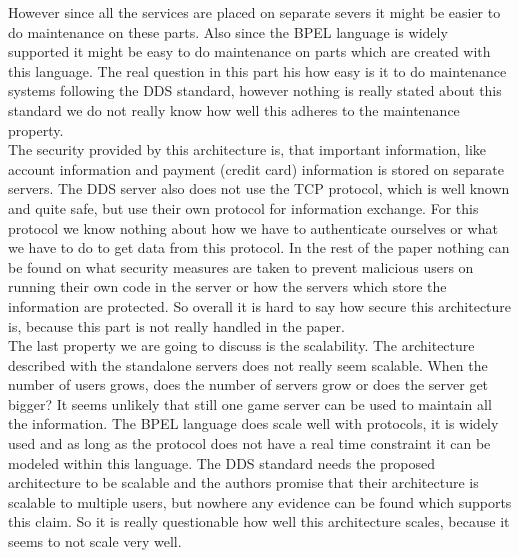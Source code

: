 \indent However since all the services are placed on separate severs it might be easier to do maintenance on these parts. 
Also since the BPEL language is widely supported it might be easy to do maintenance on parts which are created with this language. 
The real question in this part his how easy is it to do maintenance systems following the DDS standard, however nothing is really stated about this standard we do not really know how well this adheres to the maintenance property.\\
\indent The security provided by this architecture is, that important information, like account information and payment (credit card) information is stored on separate servers. 
The DDS server also does not use the TCP protocol, which is well known and quite safe, but use their own protocol for information exchange. 
For this protocol we know nothing about how we have to authenticate ourselves or what we have to do to get data from this protocol. 
In the rest of the paper nothing can be found on what security measures are taken to prevent malicious users on running their own code in the server or how the servers which store the information are protected. 
So overall it is hard to say how secure this architecture is, because this part is not really handled in the paper.\\
\indent The last property we are going to discuss is the scalability. 
The architecture described with the standalone servers does not really seem scalable. 
When the number of users grows, does the number of servers grow or does the server get bigger? 
It seems unlikely that still one game server can be used to maintain all the information. 
The BPEL language does scale well with protocols, it is widely used and as long as the protocol does not have a real time constraint it can be modeled within this language. 
The DDS standard needs the proposed architecture to be scalable and the authors promise that their architecture is scalable to multiple users, but nowhere any evidence can be found which supports this claim. 
So it is really questionable how well this architecture scales, because it seems to not scale very well.